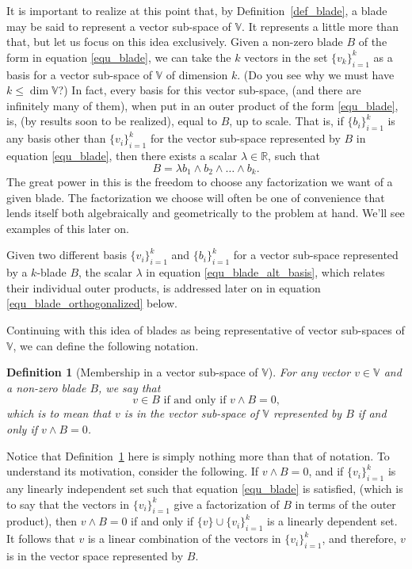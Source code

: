 \documentclass[12pt]{article}
\numberwithin{equation}{section}
\newcommand{\V}{\mathbb{V}}
\newcommand{\R}{\mathbb{R}}
\newtheorem{definition}{Definition}[section]
\begin{document}
It is important to realize at this point that, by Definition~\ref{def_blade}, a blade
may be said to represent a vector sub-space of $\V$.  It represents a little more
than that, but let us focus on this idea exclusively.  Given a non-zero blade $B$ of the
form in equation \eqref{equ_blade}, we can take the $k$ vectors in the
set $\{v_k\}_{i=1}^k$ as a basis for a vector sub-space of $\V$ of
dimension $k$.  (Do you see why we must have $k\leq\dim\V$?)
In fact, every basis for this vector sub-space, (and there are infinitely many of them), when put
in an outer product of the form \eqref{equ_blade}, is, (by results soon to be realized),
equal to $B$, up to scale.  That is, if $\{b_i\}_{i=1}^k$ is any basis
other than $\{v_i\}_{i=1}^k$
for the vector sub-space represented by $B$ in equation \eqref{equ_blade},
then there exists a scalar $\lambda\in\R$, such that
\begin{equation}\label{equ_blade_alt_basis}
B = \lambda b_1\wedge b_2\wedge\dots\wedge b_k.
\end{equation}
The great power in this is the freedom to choose any factorization we want
of a given blade.  The factorization we choose will often be one of convenience
that lends itself both algebraically and geometrically to the problem at hand.
We'll see examples of this later on.

Given two different basis $\{v_i\}_{i=1}^k$ and $\{b_i\}_{i=1}^k$ for a
vector sub-space represented by a $k$-blade $B$, the scalar $\lambda$ in equation \eqref{equ_blade_alt_basis},
which relates their individual outer products, is addressed later on in equation \eqref{equ_blade_orthogonalized}
below.

Continuing with this idea of blades as being representative of vector sub-spaces
of $\V$, we can define the following notation.
\begin{definition}[Membership in a vector sub-space of $\V$]\label{def_vec_in_blade_vecspace}
For any vector $v\in\V$ and a non-zero blade $B$, we say that
\begin{equation}
\mbox{$v\in B$ if and only if $v\wedge B=0$,}
\end{equation}
which is to mean that $v$ is in the vector sub-space of $\V$ represented by $B$
if and only if $v\wedge B=0$.
\end{definition}
Notice that Definition~\ref{def_vec_in_blade_vecspace} here is simply nothing more than that of notation.
To understand its motivation, consider the following.  If $v\wedge B=0$, and if $\{v_i\}_{i=1}^k$
is any linearly independent set such that equation \eqref{equ_blade} is
satisfied, (which is to say that the vectors in $\{v_i\}_{i=1}^k$ give a factorization
of $B$ in terms of the outer product), then $v\wedge B=0$ if and only if $\{v\}\cup\{v_i\}_{i=1}^k$
is a linearly dependent set.  It follows that $v$ is a linear combination of
the vectors in $\{v_i\}_{i=1}^k$, and therefore, $v$ is in the vector space
represented by $B$.
\end{document}
